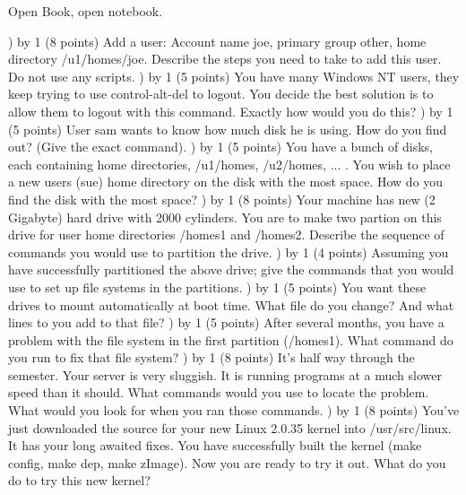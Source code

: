 
\parindent=0in
\nopagenumbers
\newcount\quesno
{}
\def\ques{\number\quesno) \advance\quesno by 1}
\def\aspace{\vskip 1.5in}

Open Book, open notebook.

\ques
(8 points)
Add a user: Account name {\ltt{}joe}, primary group {\ltt{}other},
home directory {\ltt{}/u1/homes/joe}.
Describe the steps you need to take to add this user.
Do not use any scripts.
\vskip 3.5in
\ques
(5 points)
You have many Windows NT users, they keep trying to use control-alt-del
to logout. You decide the best solution is to allow them to logout with
this command. Exactly how would you do this?
\vskip 1.2in
\ques
(5 points)
User {\ltt{}sam} wants to know how much disk he is using.
How do you find out? (Give the exact command).
\vskip 0.9in
\ques
(5 points)
You have a bunch of disks, each containing home directories,
{\ltt{}/u1/homes}, {\ltt{}/u2/homes}, ... .
You wish to place a new users ({\ltt{}sue}) home directory on
the disk with the most space.
How do you find the disk with the most space?
\vfill\eject
\ques
(8 points)
Your machine has new (2 Gigabyte) hard drive with 2000 cylinders. 
You are to make two partion on this drive for user home directories
{\ltt{}/homes1} and {\ltt{}/homes2}.
Describe the sequence of commands you would use to partition the drive.
\vskip 3.0in
\ques
(4 points)
Assuming you have successfully partitioned the above drive; give the
commands that you would use to set up file systems in the partitions.
\vskip 1.0in
\ques
(5 points)
You want these drives to mount automatically at boot time.
What file do you change? And what lines to you add to that file?
\vskip 1.2in
\ques
(5 points)
After several months, you have a problem with the file system in the first
partition ({\ltt{}/homes1}). What command do you run to fix that file system?
\vfill\eject
\ques
(8 points)
It's half way through the semester. Your server is very sluggish.
It is running programs at a much slower speed than it should.
What commands would you use to locate the problem.
What would you look for when you ran those commands.
\vskip 2.5in
\ques
(8 points)
You've just downloaded the source for your new Linux 2.0.35 kernel
into {\ltt{}/usr/src/linux}.
It has your long awaited fixes.
You have successfully built the kernel ({\ltt{}make config}, {\ltt{}make dep},
{\ltt{}make zImage}). Now you are ready to try it out.
What do you do to try this new kernel?
\vskip 2.0in
